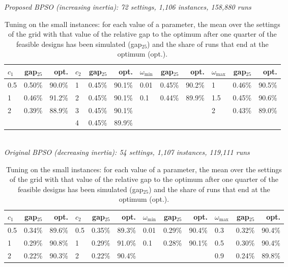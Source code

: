 \begin{table}[ht!]
\centering
\caption{Tuning on the small instances: for each value of a parameter, the mean over the settings of the grid with that value of the relative gap to the optimum after one quarter of the feasible designs has been simulated (gap$_{25}$) and the share of runs that end at the optimum (opt.).}
\label{tab:tunig_results_means}
\small
\textit{Proposed BPSO (increasing inertia): 72 settings, 1,106 instances, 158,880 runs}\\[2pt]
\begin{tabular}{lrr lrr lrr lrr }
\toprule
$c_1$ & gap$_{25}$ & opt. & $c_2$ & gap$_{25}$ & opt. & $\omega_{\min}$ & gap$_{25}$ & opt. & $\omega_{\max}$ & gap$_{25}$ & opt. \\ \midrule
0.5 & 0.50\% & 90.0\% & 1 & 0.45\% & 90.1\% & 0.01 & 0.45\% & 90.2\% & 1 & 0.46\% & 90.5\% \\
1 & 0.46\% & 91.2\% & 2 & 0.45\% & 90.1\% & 0.1 & 0.44\% & 89.9\% & 1.5 & 0.45\% & 90.6\% \\
2 & 0.39\% & 88.9\% & 3 & 0.45\% & 90.1\% &  & &  & 2 & 0.43\% & 89.0\% \\
 & &  & 4 & 0.45\% & 89.9\% &  & &  &  & &  \\
\bottomrule
\end{tabular}\\[6pt]
\textit{Original BPSO (decreasing inertia): 54 settings, 1,107 instances, 119,111 runs}\\[2pt]
\begin{tabular}{lrr lrr lrr lrr }
\toprule
$c_1$ & gap$_{25}$ & opt. & $c_2$ & gap$_{25}$ & opt. & $\omega_{\min}$ & gap$_{25}$ & opt. & $\omega_{\max}$ & gap$_{25}$ & opt. \\ \midrule
0.5 & 0.34\% & 89.6\% & 0.5 & 0.35\% & 89.3\% & 0.01 & 0.29\% & 90.4\% & 0.3 & 0.32\% & 90.4\% \\
1 & 0.29\% & 90.8\% & 1 & 0.29\% & 91.0\% & 0.1 & 0.28\% & 90.1\% & 0.5 & 0.30\% & 90.4\% \\
2 & 0.22\% & 90.3\% & 2 & 0.22\% & 90.4\% &  & &  & 0.9 & 0.24\% & 89.8\% \\
\bottomrule
\end{tabular}\\[6pt]
\end{table}
